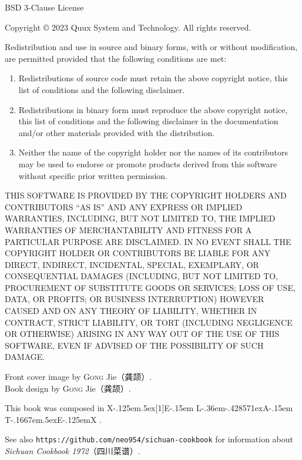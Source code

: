\begingroup%
\footnotesize%
\setlength{\parindent}{0pt}%
\setlength{\parskip}{.5\baselineskip}%
\singlespacing%
\null%
\vfill%
BSD 3-Clause License

Copyright {\copyright} 2023 Quux System and Technology. All rights reserved.

Redistribution and use in source and binary forms, with or without
modification, are permitted provided that the following conditions are met:

\begin{enumerate}
\item Redistributions of source code must retain the above copyright notice,
      this list of conditions and the following disclaimer.

\item Redistributions in binary form must reproduce the above copyright notice,
      this list of conditions and the following disclaimer in the documentation
      and/or other materials provided with the distribution.

\item Neither the name of the copyright holder nor the names of its
      contributors may be used to endorse or promote products derived from
      this software without specific prior written permission.
\end{enumerate}

THIS SOFTWARE IS PROVIDED BY THE COPYRIGHT HOLDERS AND CONTRIBUTORS ``AS IS''
AND ANY EXPRESS OR IMPLIED WARRANTIES, INCLUDING, BUT NOT LIMITED TO, THE
IMPLIED WARRANTIES OF MERCHANTABILITY AND FITNESS FOR A PARTICULAR PURPOSE ARE
DISCLAIMED. IN NO EVENT SHALL THE COPYRIGHT HOLDER OR CONTRIBUTORS BE LIABLE
FOR ANY DIRECT, INDIRECT, INCIDENTAL, SPECIAL, EXEMPLARY, OR CONSEQUENTIAL
DAMAGES (INCLUDING, BUT NOT LIMITED TO, PROCUREMENT OF SUBSTITUTE GOODS OR
SERVICES; LOSS OF USE, DATA, OR PROFITS; OR BUSINESS INTERRUPTION) HOWEVER
CAUSED AND ON ANY THEORY OF LIABILITY, WHETHER IN CONTRACT, STRICT LIABILITY,
OR TORT (INCLUDING NEGLIGENCE OR OTHERWISE) ARISING IN ANY WAY OUT OF THE USE
OF THIS SOFTWARE, EVEN IF ADVISED OF THE POSSIBILITY OF SUCH DAMAGE.

\vspace{1.5\baselineskip}

Front cover image by \textsc{Gong} Jie\!（龚颉）\!\!.\\
Book design by \textsc{Gong} Jie\!（龚颉）\!\!.

This book was composed in %
\begingroup%
\rmfamily%
\footnotesize%
X\kern-.125em\lower.5ex\hbox{\scalebox{-1}[1]{E}}\kern-.15em%
L\kern-.36em\lower-.428571ex\hbox{\tiny{A}}\kern-.15em%
T\kern-.1667em\lower.5ex\hbox{E}\kern-.125emX%
\endgroup%
.

See also \texttt{https://github.com/neo954/sichuan-cookbook} for information
about \textit{Sichuan Cookbook 1972}\!（四川菜谱）\!\!.

\endgroup%

